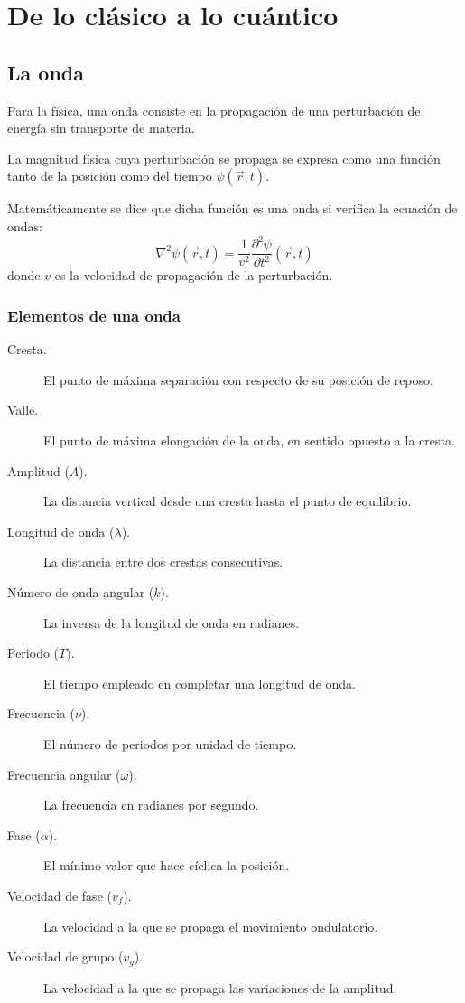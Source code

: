 \chapter{De lo clásico a lo cuántico}


\section{La onda}\label{sec:la-onda}

Para la física, una onda consiste en la propagación de una perturbación de energía sin transporte de materia.

La magnitud física cuya perturbación se propaga se expresa como una función tanto de la posición como del tiempo
$\psi(\vec{r},t)$.

Matemáticamente se dice que dicha función es una onda si verifica la ecuación de ondas:
\begin{equation}
    \label{eq:ecuacion-onda}
    \nabla^2\psi(\vec {r},t)=\frac {1}{v^2}\frac{\partial^2\psi}{\partial t^2}(\vec {r},t)
\end{equation}
donde $v$ es la velocidad de propagación de la perturbación.

\subsection{Elementos de una onda}\label{subsec:elementos-de-una-onda}

\begin{description}
    \item[Cresta.] El punto de máxima separación con respecto de su posición de reposo.
    \item[Valle.] El punto de máxima elongación de la onda, en sentido opuesto a la cresta.
    \item[Amplitud ($A$).] La distancia vertical desde una cresta hasta el punto de equilibrio.
    \item[Longitud de onda ($\lambda$).] La distancia entre dos crestas consecutivas.
    \item[Número de onda angular ($k$).] La inversa de la longitud de onda en radianes.
    \item[Periodo ($T$).] El tiempo empleado en completar una longitud de onda.
    \item[Frecuencia ($\nu$).] El número de periodos por unidad de tiempo.
    \item[Frecuencia angular ($\omega$).] La frecuencia en radianes por segundo.
    \item[Fase ($\alpha$).] El mínimo valor que hace cíclica la posición.
    \item[Velocidad de fase ($v_f$).] La velocidad a la que se propaga el movimiento ondulatorio.
    \item[Velocidad de grupo ($v_g$).] La velocidad a la que se propaga las variaciones de la amplitud.
\end{description}

